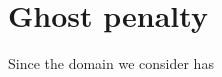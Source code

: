 \documentclass[10pt, a4paper]{article}
\begin{document}
 

% 
% 
 
 
%  
 
 
 
 

\section{Ghost penalty}

Since the domain we consider has 

 
 
\end{document}
